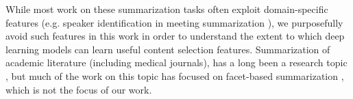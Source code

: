 While most work on these summarization tasks
 often exploit domain-specific features (e.g. speaker identification in meeting summarization \cite{galley2006skip,gillick2009global}),
we purposefully avoid such features in this work in order to understand 
the extent to which deep learning models can learn useful content 
selection features.
Summarization of academic literature (including medical journals), has a long 
been a research topic
\cite{kupiec1995trainable,elhadad2005customization}, but much of the work on this topic has
focused on facet-based summarization \cite{jaidka2017insights}, which is not the focus of our work.












%
%
%
%



